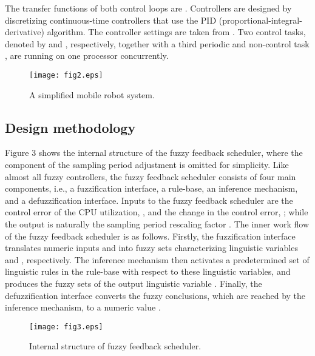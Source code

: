 \documentclass[12pt,a4paper]{ijicic}
\begin{document}
The transfer functions of both control loops are . Controllers are designed by discretizing
continuous-time controllers that use the PID
(proportional-integral-derivative) algorithm. The controller
settings are taken from \cite{R4}. Two control tasks, denoted by 
and , respectively, together with a third periodic and
non-control task , are running on one processor
concurrently.

\begin{figure}[htb!]
\begin{center}
\texttt{[image: fig2.eps]}
\caption{A simplified mobile robot system.}
\label{fig2}
\end{center}
\end{figure}

\subsection{Design methodology}

Figure 3 shows the internal structure of the fuzzy
feedback scheduler, where the component of the sampling period
adjustment is omitted for simplicity. Like almost all fuzzy
controllers, the fuzzy feedback scheduler consists of four main
components, i.e., a fuzzification interface, a rule-base, an
inference mechanism, and a defuzzification interface. Inputs to the
fuzzy feedback scheduler are the control error of the CPU utilization,
, and the change in the control error, ; while the output is naturally the sampling period
rescaling factor . The inner work flow of the fuzzy feedback
scheduler is as follows. Firstly, the fuzzification interface
translates numeric inputs  and  into fuzzy sets
characterizing linguistic variables  and , respectively. The
inference mechanism then activates a predetermined set of linguistic
rules in the rule-base with respect to these linguistic variables,
and produces the fuzzy sets of the output linguistic variable .
Finally, the defuzzification interface converts the fuzzy
conclusions, which are reached by the inference mechanism, to a
numeric value .
\begin{figure}[htb!]
\begin{center}
\texttt{[image: fig3.eps]}
\caption{Internal structure of fuzzy feedback scheduler.}
\label{fig3}
\end{center}
\end{figure}
\end{document}
